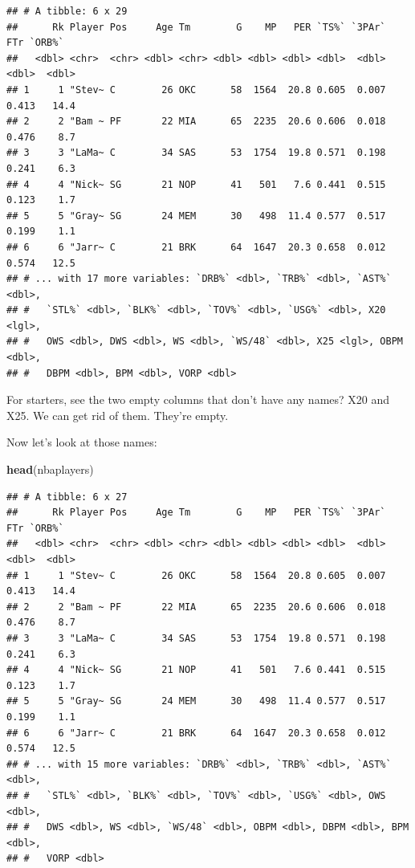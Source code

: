 \documentclass[]{book}
\newenvironment{Shaded}{\begin{snugshade}}{\end{snugshade}}
\newcommand{\KeywordTok}[1]{\textcolor[rgb]{0.13,0.29,0.53}{\textbf{#1}}}
\newcommand{\NormalTok}[1]{#1}
\newcommand{\OperatorTok}[1]{\textcolor[rgb]{0.81,0.36,0.00}{\textbf{#1}}}
\newcommand{\StringTok}[1]{\textcolor[rgb]{0.31,0.60,0.02}{#1}}
\begin{document}
\begin{verbatim}
## # A tibble: 6 x 29
##      Rk Player Pos     Age Tm        G    MP   PER `TS%` `3PAr`   FTr `ORB%`
##   <dbl> <chr>  <chr> <dbl> <chr> <dbl> <dbl> <dbl> <dbl>  <dbl> <dbl>  <dbl>
## 1     1 "Stev~ C        26 OKC      58  1564  20.8 0.605  0.007 0.413   14.4
## 2     2 "Bam ~ PF       22 MIA      65  2235  20.6 0.606  0.018 0.476    8.7
## 3     3 "LaMa~ C        34 SAS      53  1754  19.8 0.571  0.198 0.241    6.3
## 4     4 "Nick~ SG       21 NOP      41   501   7.6 0.441  0.515 0.123    1.7
## 5     5 "Gray~ SG       24 MEM      30   498  11.4 0.577  0.517 0.199    1.1
## 6     6 "Jarr~ C        21 BRK      64  1647  20.3 0.658  0.012 0.574   12.5
## # ... with 17 more variables: `DRB%` <dbl>, `TRB%` <dbl>, `AST%` <dbl>,
## #   `STL%` <dbl>, `BLK%` <dbl>, `TOV%` <dbl>, `USG%` <dbl>, X20 <lgl>,
## #   OWS <dbl>, DWS <dbl>, WS <dbl>, `WS/48` <dbl>, X25 <lgl>, OBPM <dbl>,
## #   DBPM <dbl>, BPM <dbl>, VORP <dbl>
\end{verbatim}

For starters, see the two empty columns that don't have any names? X20 and X25. We can get rid of them. They're empty.

\begin{Shaded}
\end{Shaded}

Now let's look at those names:

\begin{Shaded}
\begin{Highlighting}[]
\KeywordTok{head}\NormalTok{(nbaplayers)}
\end{Highlighting}
\end{Shaded}

\begin{verbatim}
## # A tibble: 6 x 27
##      Rk Player Pos     Age Tm        G    MP   PER `TS%` `3PAr`   FTr `ORB%`
##   <dbl> <chr>  <chr> <dbl> <chr> <dbl> <dbl> <dbl> <dbl>  <dbl> <dbl>  <dbl>
## 1     1 "Stev~ C        26 OKC      58  1564  20.8 0.605  0.007 0.413   14.4
## 2     2 "Bam ~ PF       22 MIA      65  2235  20.6 0.606  0.018 0.476    8.7
## 3     3 "LaMa~ C        34 SAS      53  1754  19.8 0.571  0.198 0.241    6.3
## 4     4 "Nick~ SG       21 NOP      41   501   7.6 0.441  0.515 0.123    1.7
## 5     5 "Gray~ SG       24 MEM      30   498  11.4 0.577  0.517 0.199    1.1
## 6     6 "Jarr~ C        21 BRK      64  1647  20.3 0.658  0.012 0.574   12.5
## # ... with 15 more variables: `DRB%` <dbl>, `TRB%` <dbl>, `AST%` <dbl>,
## #   `STL%` <dbl>, `BLK%` <dbl>, `TOV%` <dbl>, `USG%` <dbl>, OWS <dbl>,
## #   DWS <dbl>, WS <dbl>, `WS/48` <dbl>, OBPM <dbl>, DBPM <dbl>, BPM <dbl>,
## #   VORP <dbl>
\end{verbatim}
\end{document}
